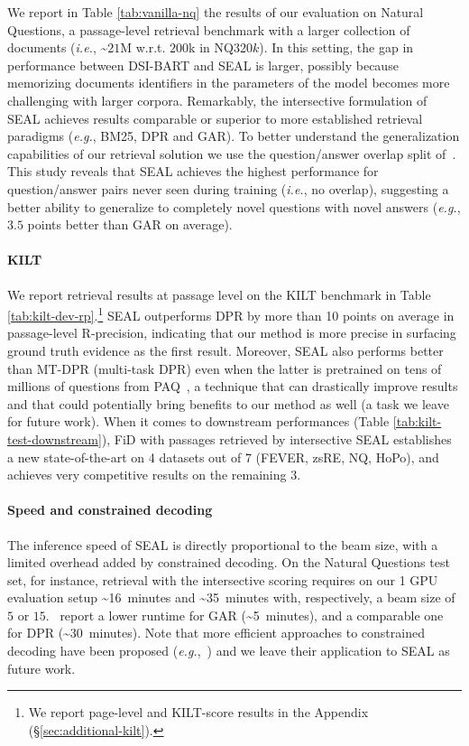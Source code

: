 \documentclass[11pt]{article}
\newcommand{\eg}{\textit{e.g.}}
\newcommand{\ie}{\textit{i.e.}}
\newcommand{\system}{\textsc{SEAL}}
\begin{document}
We report in Table \ref{tab:vanilla-nq} the results of our evaluation on Natural Questions, a passage-level retrieval benchmark with a larger collection of documents (\ie, \textasciitilde$21$M w.r.t. $200$k in NQ320$k$). In this setting, the gap in performance between DSI-BART and \system{} is larger, possibly because memorizing documents identifiers in the parameters of the model becomes more challenging with larger corpora. 
Remarkably, the intersective formulation of \system{} achieves results comparable or superior to more established retrieval paradigms (\eg, BM25, DPR and GAR). 
To better understand the generalization capabilities of our retrieval solution we use the question/answer overlap split of~\citet{lewis-etal-2021-question}. This study reveals that \system{} achieves the highest performance for question/answer pairs never seen during training (\ie, no overlap), suggesting a better ability to generalize to completely
novel questions with novel answers (\eg, $3.5$ points better than GAR on average). 

\paragraph{KILT}
We report retrieval results at passage level on the KILT benchmark in Table \ref{tab:kilt-dev-rp}.\footnote{We report page-level and KILT-score results in the Appendix (§\ref{sec:additional-kilt}).} \system{} outperforms DPR by more than 10  points on average in passage-level R-precision, indicating that our method is more precise in surfacing ground truth evidence as the first result. 
Moreover, \system{} also performs better than MT-DPR (multi-task DPR) even when the latter is pretrained on tens of millions of questions from PAQ~\citep{lewis-etal-2021-paq}, a technique that can drastically improve results and that could potentially bring benefits to our method as well (a task we leave for future work).
When it comes to downstream performances  (Table \ref{tab:kilt-test-downstream}), FiD with passages retrieved by intersective \system{} establishes a new state-of-the-art on 4 datasets out of 7 (FEVER, zsRE, NQ, HoPo), and achieves very competitive results on the remaining 3. 

\paragraph{Speed and constrained decoding} The inference speed of \system{} is directly proportional to the beam size, with a limited overhead added by constrained decoding. On the Natural Questions test set, for instance, retrieval with the intersective scoring requires on our 1 GPU evaluation setup \textasciitilde16~minutes and \textasciitilde35~minutes with, respectively, a beam size of $5$ or $15$.~\citet{mao-etal-2021-generation} report a lower runtime for GAR (\textasciitilde5~minutes), and a comparable one for DPR (\textasciitilde30~minutes). 
Note that more efficient approaches to constrained decoding have been proposed (\eg,~\citet{de-cao-etal-2021-highly}) and we leave their application to \system{} as future work. 
\end{document}
